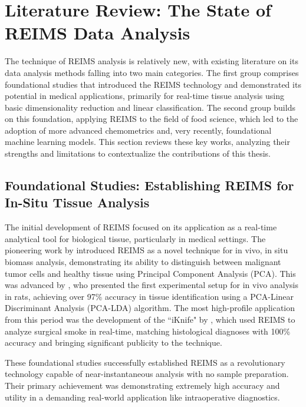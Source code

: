 \section{Literature Review: The State of REIMS Data Analysis}
\label{sec:reims-lit-review}

The technique of REIMS analysis is relatively new, with existing literature on its data analysis methods falling into two main categories. The first group comprises foundational studies that introduced the REIMS technology and demonstrated its potential in medical applications, primarily for real-time tissue analysis using basic dimensionality reduction and linear classification. The second group builds on this foundation, applying REIMS to the field of food science, which led to the adoption of more advanced chemometrics and, very recently, foundational machine learning models. This section reviews these key works, analyzing their strengths and limitations to contextualize the contributions of this thesis.

\subsection{Foundational Studies: Establishing REIMS for In-Situ Tissue Analysis}

The initial development of REIMS focused on its application as a real-time analytical tool for biological tissue, particularly in medical settings. The pioneering work by \cite{Schaefer2009}
introduced REIMS as a novel technique for in vivo, in situ biomass analysis, demonstrating its ability to distinguish between malignant tumor cells and healthy tissue using Principal Component Analysis (PCA). This was advanced by
\cite{Balog2010}, who presented the first experimental setup for in vivo analysis in rats, achieving over 97\% accuracy in tissue identification using a PCA-Linear Discriminant Analysis (PCA-LDA) algorithm. The most high-profile application from this period was the development of the ``iKnife" by
\cite{Balog2013}, which used REIMS to analyze surgical smoke in real-time, matching histological diagnoses with 100\% accuracy and bringing significant publicity to the technique.

These foundational studies successfully established REIMS as a revolutionary technology capable of near-instantaneous analysis with no sample preparation. Their primary achievement was demonstrating extremely high accuracy and utility in a demanding real-world application like intraoperative diagnostics.

